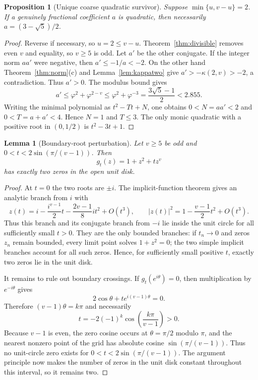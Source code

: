 \documentclass[11pt]{article}
\newtheorem{lemma}[theorem]{Lemma}
\newtheorem{proposition}[theorem]{Proposition}
\theoremstyle{remark}
\newcommand{\ph}{\varphi}
\numberwithin{equation}{section}
\begin{document}
\begin{proposition}[Unique coarse quadratic survivor]\label{prop:quadratic}
Suppose $\min\{u,v-u\}=2$.  If a genuinely fractional coefficient $a$ is
quadratic, then necessarily $a=(3-\sqrt5)/2$.
\end{proposition}
\begin{proof}
Reverse if necessary, so $u=2\le v-u$.  Theorem~\ref{thm:divisible} removes
even $v$ and equality, so $v\ge5$ is odd.  Let $a'$ be the other conjugate.
If the integer norm $aa'$ were negative, then $a'\le-1/a<-2$.  On the other
hand Theorem~\ref{thm:norm}(c) and Lemma~\ref{lem:kappatwo} give
$a'>-\kappa(2,v)>-2$, a contradiction.  Thus $a'>0$.  The modulus bound gives
\[
 a'\le\ph^2+\ph^{2-v}\le\ph^2+\ph^{-3}
     =\frac{3\sqrt5-1}{2}<2.855.
\]
Writing the minimal polynomial as $t^2-Tt+N$, one obtains
$0<N=aa'<2$ and $0<T=a+a'<4$.  Hence $N=1$ and $T\le3$.  The only monic
quadratic with a positive root in $(0,1/2)$ is $t^2-3t+1$.
\end{proof}

\begin{lemma}[Boundary-root perturbation]\label{lem:boundary}
Let $v\ge5$ be odd and $0<t<2\sin(\pi/(v-1))$.  Then
\[
 g_t(z)=1+z^2+t z^v
\]
has exactly two zeros in the open unit disk.
\end{lemma}
\begin{proof}
At $t=0$ the two roots are $\pm i$.  The implicit-function theorem gives an
analytic branch from $i$ with
\[
 z(t)=i-\frac{i^{v-1}}2t-\frac{2v-1}{8}it^2+O(t^3),
 \qquad
 |z(t)|^2=1-\frac{v-1}{2}t^2+O(t^3).
\]
Thus this branch and its conjugate branch from $-i$ lie inside the unit circle
for all sufficiently small $t>0$.  They are the only bounded branches: if
$t_n\to0$ and zeros $z_n$ remain bounded, every limit point solves
$1+z^2=0$; the two simple implicit branches account for all such zeros.
Hence, for sufficiently small positive $t$, exactly two zeros lie in the unit
disk.

It remains to rule out boundary crossings.  If $g_t(e^{i\theta})=0$, then
multiplication by $e^{-i\theta}$ gives
\[
 2\cos\theta+t e^{i(v-1)\theta}=0.
\]
Therefore $(v-1)\theta=k\pi$ and necessarily
\[
 t=-2(-1)^k\cos\!\left(\frac{k\pi}{v-1}\right)>0.
\]
Because $v-1$ is even, the zero cosine occurs at $\theta=\pi/2$ modulo
$\pi$, and the nearest nonzero point of the grid has absolute cosine
$\sin(\pi/(v-1))$.  Thus no unit-circle zero exists for
$0<t<2\sin(\pi/(v-1))$.  The argument principle now makes the number of
zeros in the unit disk constant throughout this interval, so it remains two.
\end{proof}
\end{document}
